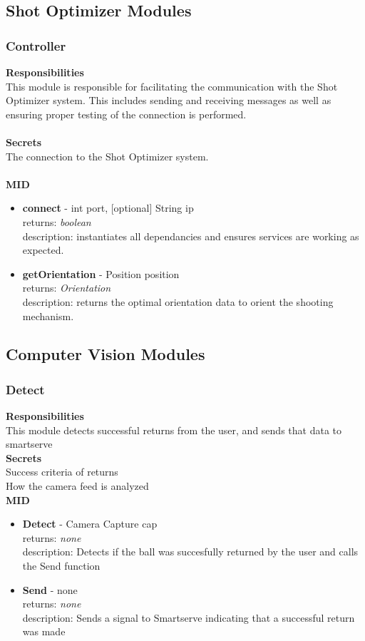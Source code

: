 \documentclass[11pt]{article}
\begin{document}
\subsection{Shot Optimizer Modules}
\subsubsection*{Controller}
\textbf{Responsibilities} \\
This module is responsible for facilitating the communication with the Shot Optimizer system. This includes sending and receiving messages as well as ensuring proper testing of the connection is performed. \\ \\
\textbf{Secrets} \\ 
The connection to the Shot Optimizer system. \\ \\
\textbf{MID} 
\begin{itemize}
\item \textbf{connect} - int  port, [optional] String ip \\ returns: \textit{boolean} \\ description: instantiates all dependancies and ensures services are working as expected.
\item \textbf{getOrientation} - Position  position \\ returns: \textit{Orientation} \\ description: returns the optimal orientation data to orient the shooting mechanism.
\end{itemize}



\subsection{Computer Vision Modules}
\subsubsection*{Detect}
\textbf{Responsibilities} \\
This module detects successful returns from the user, and sends that data to smartserve\\
\textbf{Secrets} \\ 
Success criteria of returns\\
How the camera feed is analyzed\\ 
\textbf{MID} 
\begin{itemize}
\item \textbf{Detect} - Camera Capture cap \\ returns: \textit{none} \\ description: Detects if the ball was succesfully returned by the user and calls the Send function
\item \textbf{Send} -  none \\ returns: \textit{none} \\ description: Sends a signal to Smartserve indicating that a successful return was made
\end{itemize}
\end{document}

